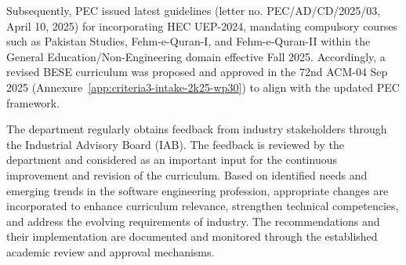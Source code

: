 Subsequently, PEC issued latest guidelines (letter no. PEC/AD/CD/2025/03, April 10, 2025) for incorporating HEC UEP-2024, mandating compulsory courses such as Pakistan Studies, Fehm-e-Quran-I, and Fehm-e-Quran-II within the General Education/Non-Engineering domain effective Fall 2025. Accordingly, a revised BESE curriculum was proposed and approved in the 72nd ACM-04 Sep 2025 (Annexure~\ref{app:criteria3-intake-2k25-wp30}) to align with the updated PEC framework.

The department regularly obtains feedback from industry stakeholders through the Industrial Advisory Board (IAB). The feedback is reviewed by the department and considered as an important input for the continuous improvement and revision of the curriculum. Based on identified needs and emerging trends in the software engineering profession, appropriate changes are incorporated to enhance curriculum relevance, strengthen technical competencies, and address the evolving requirements of industry. The recommendations and their implementation are documented and monitored through the established academic review and approval mechanisms.

